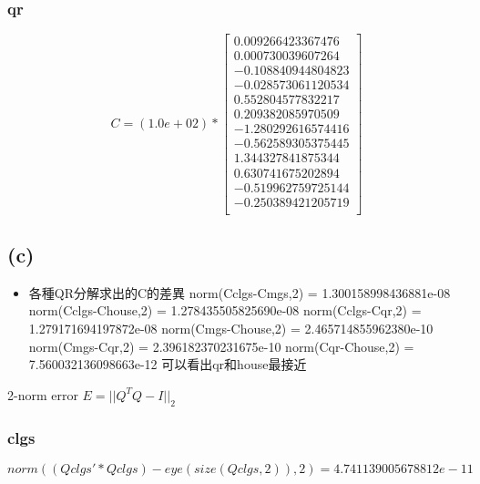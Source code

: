 \documentclass{article}
\begin{document}
            \subsubsection*{qr}
            \[
                C = (1.0e+02) * \left[
                \begin{array}{c}
                    0.009266423367476\\
                    0.000730039607264\\
                    -0.108840944804823\\
                    -0.028573061120534\\
                    0.552804577832217\\
                    0.209382085970509\\
                    -1.280292616574416\\
                    -0.562589305375445\\
                    1.344327841875344\\
                    0.630741675202894\\
                    -0.519962759725144\\
                    -0.250389421205719\\
                \end{array}
                \right]
            \]
        \subsection*{(c)}
            \begin{itemize}
                \item 各種QR分解求出的C的差異
                    \subitem norm(Cclgs-Cmgs,2) = 1.300158998436881e-08
                    \subitem norm(Cclgs-Chouse,2) = 1.278435505825690e-08 
                    \subitem norm(Cclgs-Cqr,2) = 1.279171694197872e-08
                    \subitem norm(Cmgs-Chouse,2) = 2.465714855962380e-10
                    \subitem norm(Cmgs-Cqr,2) = 2.396182370231675e-10
                    \subitem norm(Cqr-Chouse,2) = 7.560032136098663e-12
                    \subitem 可以看出qr和house最接近
            \end{itemize}
                2-norm error $E = ||Q^TQ-I||_2$
            \subsubsection*{clgs}
                \[
                    norm((Qclgs'*Qclgs)-eye(size(Qclgs,2)),2) = 4.741139005678812e-11    
                \]
\end{document}
